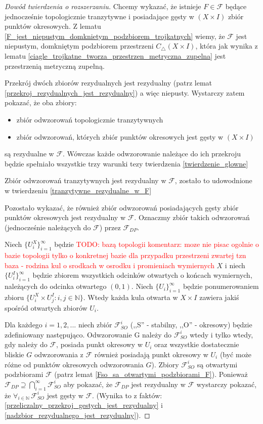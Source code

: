 \documentclass[licencjacka]{pwr_wmat_praca_dyplomowa}
\theoremstyle{plain}
\numberwithin{theorem}{chapter}
\theoremstyle{definition}
\numberwithin{theorem}{chapter}
\begin{document}
\begin{proof}[Dowód twierdzenia o rozszerzaniu]
Chcemy wykazać, że istnieje $F \in \mathcal{F}$ będące jednocześnie topologicznie tranzytywne i posiadające gęsty w $(X \times I)$ zbiór punktów okresowych. Z lematu \ref{F_jest_niepustym_domknietym_podzbiorem_trojkatnych} wiemy, że $\mathcal{F}$ jest niepustym, domkniętym podzbiorem przestrzeni $C_{\triangle}(X \times I)$, która jak wynika z lematu \ref{ciagle_trojkatne_tworza_przestrzen_metryczna_zupelna} jest przestrzenią metryczną zupełną. 

Przekrój dwóch zbiorów rezydualnych jest rezydualny (patrz lemat \ref{przekroj_rezydualnych_jest_rezydualny}) a więc niepusty. Wystarczy zatem pokazać, że oba zbiory:
\begin{itemize}
\item zbiór odwzorowań topologicznie tranzytywnych
\item zbiór odwzorowań, których zbiór punktów okresowych jest gęsty w $(X \times I)$
\end{itemize}
są rezydualne w $\mathcal{F}$. Wówczas każde odwzorowanie należące do ich przekroju będzie spełniało wszystkie trzy warunki tezy twierdzenia \ref{twierdzenie_glowne} 

Zbiór odwzorowań tranzytywnych jest rezydualny w $\mathcal{F}$, zostało to udowodnione w twierdzeniu \ref{tranzytywne_rezydualne_w_F}

Pozostało wykazać, że również zbiór odwzorowań posiadających gęsty zbiór punktów okresowych jest rezydualny w $\mathcal{F}$.
Oznaczmy zbiór takich odwzorowań (jednocześnie należących do $\mathcal{F}$) przez $\mathcal{F}_{DP}$.

Niech $\{U_i^X\}_{i=1}^{\infty}$ będzie \textcolor{red}{TODO: bazą topologii komentarz: moze nie pisac ogolnie o bazie topologii tylko o konkretnej bazie dla przypadku przestrzeni zwartej tzn baza - rodzina kul o srodkach w osrodku i promieniach wymiernych} $X$ i niech $\{U_i^I\}_{i=1}^{\infty}$ będzie zbiorem wszystkich odcinków otwartych o końcach wymiernych, należących do odcinka otwartego $(0, 1)$. Niech $\{U_i\}_{i=1}^{\infty}$ będzie ponumerowaniem zbioru $\{U_i^X \times U_j^I : i,j \in \mathbb{N}\}$. Wtedy każda kula otwarta w $X \times I$ zawiera jakiś spośród otwartych zbiorów $U_i$.

Dla każdego $i=1,2,...$ niech zbiór $\mathcal{F}_{SO}^i$ (,,S'' - stabilny, ,,O'' - okresowy) będzie zdefiniowany następująco. Odwzorowanie G należy do $\mathcal{F}_{SO}^i$ wtedy i tylko wtedy, gdy należy do $\mathcal{F}$, posiada punkt okresowy w $U_i$ oraz wszystkie dostatecznie bliskie $G$ odwzorowania z $\mathcal{F}$ również posiadają punkt okresowy w $U_i$ (być może różne od punktów okresowych odwzorowania $G$). Zbiory $\mathcal{F}_{SO}^i$ są otwartymi podzbiorami $\mathcal{F}$ (patrz lemat \ref{Fso_sa_otwartymi_podzbiorami_F}). Ponieważ $\mathcal{F}_{DP} \supseteq \bigcap_{i=1}^{\infty} \mathcal{F}_{SO}^i$ aby pokazać, że $\mathcal{F}_{DP}$ jest rezydualny w $\mathcal{F}$ wystarczy pokazać, że $\forall_{i \in \mathbb{N}} \, \mathcal{F}_{SO}^i$ jest gęsty w $\mathcal{F}$. (Wynika to z faktów: \ref{przeliczalny_przekroj_gestych_jest_rezydualny}  i \ref{nadzbior_rezydualnego_jest_rezydualny}).


\end{proof}
\end{document}
